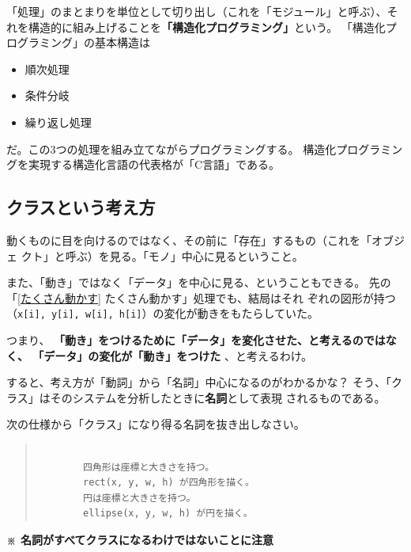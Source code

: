 \documentclass[uplatex,a4j,11pt]{jsarticle}
\renewcommand{\baselinestretch}{1.08}
\begin{document}
「処理」のまとまりを単位として切り出し（これを「モジュール」と呼ぶ）、そ
れを構造的に組み上げることを{\bfseries 「構造化プログラミング」}という。
「構造化プログラミング」の基本構造は
\begin{itemize}
 \item 順次処理
 \item 条件分岐
 \item 繰り返し処理
\end{itemize}
だ。この3つの処理を組み立てながらプログラミングする。
構造化プログラミングを実現する構造化言語の代表格が「C言語」である。

\subsection{クラスという考え方}

動くものに目を向けるのではなく、その前に「存在」するもの（これを「オブジェ
クト」と呼ぶ）を見る。「モノ」中心に見るということ。

また、「動き」ではなく「データ」を中心に見る、ということもできる。
先の「\ref{たくさん動かす} たくさん動かす」処理でも、結局はそれ
ぞれの図形が持つ（\verb|x[i], y[i], w[i], h[i]|）の変化が動きをもたらしていた。

つまり、
{\bfseries 
「動き」をつけるために「データ」を変化させた、と考えるのではなく、
「データ」の変化が「動き」をつけた
}
、と考えるわけ。

すると、考え方が「動詞」から「名詞」中心になるのがわかるかな？
そう、「クラス」はそのシステムを分析したときに{\bfseries 名詞}として表現
されるものである。

次の仕様から「クラス」になり得る名詞を抜き出しなさい。

    \begin{quote}
	\begin{minipage}{\linewidth}
	 \begin{shadebox}
      \def\baselinestretch{.8}\selectfont
      \small
      \begin{verbatim}

        四角形は座標と大きさを持つ。
        rect(x, y, w, h) が四角形を描く。
        円は座標と大きさを持つ。
        ellipse(x, y, w, h) が円を描く。
      \end{verbatim}
	 \end{shadebox} 
	 \end{minipage}
	\end{quote}

    {\bfseries ※ 名詞がすべてクラスになるわけではないことに注意}
\end{document}
